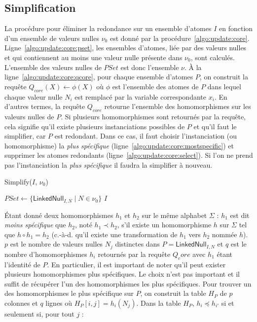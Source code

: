 \subsection{Simplification}
La procédure pour éliminer la redondance sur un ensemble d'atomes $I$ en fonction d'un ensemble de valeurs nulles $\nu_0$ est donné par la procédure~\ref{algo:update:core}.
Ligne~\ref{algo:update:core:pset}, les ensembles d'atomes, liée par des valeurs nulles et qui contiennent au moins une valeur nulle présente dans $\nu_0$, sont calculés.
L'ensemble des valeurs nulles de $PSet$ est donc l'ensemble $\nu$.
À la ligne~\ref{algo:update:core:qcore}, pour chaque ensemble d'atomes $P$, on construit la requête $Q_{core}(X) \gets \phi(X)$ où $\phi$ est l'ensemble des atomes de $P$ dans lequel chaque valeur nulle $N_i$ est remplacé par la variable correspondante $x_i$.
En d'autres termes, la requête $Q_{core}$ retourne l'ensemble des homomorphismes sur les valeurs nulles de $P$.
Si plusieurs homomorphismes sont retournés par la requête, cela signifie qu'il existe plusieurs instanciations possibles de $P$ et qu'il faut le simplifier, car $P$ est redondant.
Dans ce cas, il faut choisir l'instanciation (ou homomorphisme) la \textit{plus spécifique} (ligne~\ref{algo:update:core:mostspecific}) et supprimer les atomes redondants (ligne~\ref{algo:update:core:select}).
Si l'on ne prend pas l'instanciation la \textit{plus spécifique} il faudra la simplifier à nouveau.

\begin{procedure}[htb]
	\caption{Simplify($I$, $\nu_0$)}
	\label{algo:update:core}

	$PSet \gets \{\textsf{LinkedNull}_{I,N} \mid N \in \nu_0\}$\; \label{algo:update:core:pset}
	\Return $I$\;
\end{procedure}

Étant donné deux homomorphismes $h_1$ et $h_2$ sur le même alphabet $\Sigma$ : $h_1$ est dit \textit{moins spécifique} que $h_2$, noté $h_1 \prec h_2$, s'il existe un homomorphisme $h$ sur $\Sigma$ tel que $h \circ h_1 = h_2$ (c.-à-d. qu'il existe une transformation de $h_1$ vers $h_2$ nommée $h$).
$p$ est le nombre de valeurs nulles $N_j$ distinctes dans $P = \textsf{LinkedNull}_{I,N}$ et $q$ est le nombre d'homomorphismes $h_i$ retournés par la requête $Q_core$ avec $h_1$ étant l'identité de $P$.
En particulier, il est important de noter qu'il peut exister plusieurs homomorphismes plus spécifiques.
Le choix n'est pas important et il suffit de récupérer l'un des homomorphismes les plus spécifiques.
Pour trouver un des homomorphismes le plus spécifique sur $P$, on construit la table $H_P$ de $p$ colonnes et $q$ lignes où $H_P[i, j] = h_i(N_j)$.
Dans la table $H_P$, $h_i \preceq h_{i'}$ si et seulement si, pour tout $j$ :

